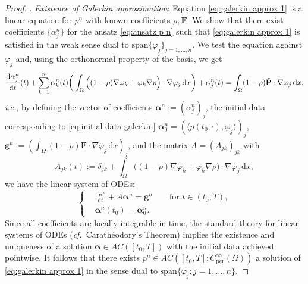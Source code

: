 \documentclass[11pt,a4paper,reqno]{amsart}
\theoremstyle{remark}
\theoremstyle{definition}
\numberwithin{equation}{section}
\newcommand{\per}{\mathrm{per}}
\renewcommand{\P}{{\bf P}}
\renewcommand{\d}{\, \mathrm{d} }
\newcommand{\der}{\mathrm{d}}
\begin{document}
\begin{proof}
. \textit{Existence of Galerkin approximation}: Equation \eqref{eq:galerkin approx 1} is a linear equation for $p^n$ with known coefficients $\rho,\mathbf{F}$. We show that there exist coefficients $\{\alpha^n_j\}$ for the ansatz \eqref{eq:ansatz p n} such that \eqref{eq:galerkin approx 1} is satisfied in the weak sense dual to $\mathrm{span}\{\varphi_j\}_{j=1,\dots,n}$. We test the equation against $\varphi_{j}$ and, using the orthonormal property of the basis, we get 
\begin{equation*}
    \begin{aligned}
        \frac{\der \alpha^n_{j}}{\der t}(t)  + \sum_{k=1}^n  \alpha^n_{k}(t) \bigg( \int_\Omega \Big( (1-\rho) \nabla \varphi_k + \varphi_k \nabla \rho \Big) \cdot \nabla\varphi_{j} \d x \bigg) + \alpha^n_j(t) = \int_\Omega (1-\rho)\tilde{\P}\cdot \nabla \varphi_j \d x, 
    \end{aligned}
\end{equation*}
\textit{i.e.}, by defining the vector of coefficients $\boldsymbol{\alpha}^n := (\alpha^n_{j})_{j}$, the initial data corresponding to \eqref{eq:initial data galerkin} $\boldsymbol{\alpha}^n_0 = (\langle p(t_0,\cdot), \varphi_{j} \rangle )_j $, $\mathbf{g}^n := (\int_\Omega (1-\rho) \mathbf{F}\cdot \nabla \varphi_j \d x)_{j}$, and the matrix $A = (A_{jk})_{jk}$ with 
\begin{equation*}
    A_{{jk}}(t) := \delta_{jk} + \int_\Omega \Big( (1-\rho) \nabla \varphi_k + \varphi_k \nabla \rho \Big) \cdot \nabla\varphi_{j} \d x , 
\end{equation*}
we have the linear system of ODEs: 
\begin{equation}\label{eq:system ode linear}
   \left\lbrace\begin{aligned} &\frac{\der \boldsymbol{\alpha}^n}{\der t} + A\boldsymbol{\alpha}^n = \mathbf{g}^n \qquad \text{for } t \in (t_0,T), \\ 
   &\boldsymbol{\alpha}^n(t_0) = \boldsymbol{\alpha}^n_0. 
   \end{aligned}\right. 
\end{equation}
Since all coefficients are locally integrable in time, the standard theory for linear systems of ODEs (\textit{cf.}~Carath\'eodory's Theorem) implies the existence and uniqueness of a solution $\boldsymbol{\alpha} \in AC([t_0,T])$ with the initial data achieved pointwise. It follows that there exists $p^n \in AC([t_0,T];C^\infty_\per(\Omega))$ a solution of \eqref{eq:galerkin approx 1} in the sense dual to $\mathrm{span}\{\varphi_{j}: j=1,\dots,n\}$. 



\end{proof}
\end{document}
